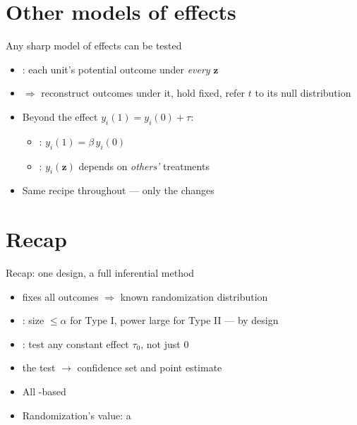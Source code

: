 \documentclass[table, xcolor = {dvipsnames}, 9pt]{beamer}
\theoremstyle{plain}
\newcommand{\mh}[1]{{\color{magenta}{#1}}}
\begin{document}
\section{Other models of effects}
\begin{frame}[t]{Any sharp model of effects can be tested}
\vfill
\begin{itemize} \vfill
\item \mh{Sharp model}: each unit's potential outcome under \emph{every} $\bm{z}$ \vfill
\item[] $\Rightarrow$ reconstruct outcomes under it, hold fixed, refer $t$ to its null distribution \vfill
\item Beyond the \mh{constant} effect $y_i(1) = y_i(0) + \tau$: \vfill
\begin{itemize} \vfill
\item \mh{multiplicative}: $y_i(1) = \beta\, y_i(0)$ \citep{rosenbaum2002a} \vfill
\item \mh{interference}: $y_i(\bm{z})$ depends on \emph{others'} treatments \citep{bowersetal2013} \vfill
\end{itemize} \vfill
\item Same recipe throughout --- only the \mh{model} changes \vfill
\end{itemize} \vfill
\end{frame}
\section{Recap}
\begin{frame}[t]{Recap: one design, a full inferential method}
\vfill
\begin{itemize} \vfill
\item \mh{Sharp null} fixes all outcomes $\Rightarrow$ known randomization distribution \vfill
\item \mh{Error rates}: size $\leq \alpha$ for Type I, power large for Type II --- by design \vfill
\item \mh{Adjusted outcomes}: test any constant effect $\tau_0$, not just $0$ \vfill
\item \mh{Invert} the test $\to$ confidence set and point estimate \vfill
\item All \mh{design}-based \vfill
\item Randomization's value: a \mh{reasoned basis for inference} \vfill
\end{itemize} \vfill
\end{frame}
\end{document}
